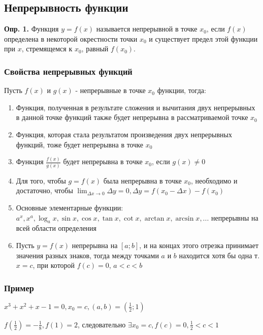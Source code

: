 \documentclass{article}
\begin{document}
\subsection{Непрерывность функции}

\textbf{Опр. 1.} Функция $y = f(x)$ называется непрерывной в точке $x_0$, если $f(x)$ определена в некоторой окрестности точки $x_0$ и существует предел этой функции при $x$, стремящемся к $x_0$, равный $f(x_0)$.

\subsubsection{Свойства непрерывных функций}

Пусть $f(x)$ и $g(x)$ - непрерывные в точке $x_0$ функции, тогда:

\begin{enumerate}
    \item Функция, полученная в результате сложения и вычитания двух непрерывных в данной точке функций также будет непрерывна в рассматриваемой точке $x_0$
    \item Функция, которая стала результатом произведения двух непрерывных функций, тоже будет непрерывна в точке $x_0$
    \item Функция $\frac{f(x)}{g(x)}$ будет непрерывна в точке $x_0$, если $g(x) \ne 0$
    \item Для того, чтобы $g = f(x)$ была непрерывна в точке $x_0$, необходимо и достаточно, чтобы $\lim_{\Delta x \to 0} \Delta y = 0, \Delta y = f(x_0 - \Delta x) - f(x_0)$
    \item Основные элементарные функции: $a^x, x^a, \log_{a} x, \sin x, \cos x, \tan x, \cot x, \arctan x, \arcsin x, ...$ непрерывны на всей области определения
    \item Пусть $y=f(x)$ непрерывна на $[a; b]$, и на концах этого отрезка принимает значения разных знаков, тогда между точками $a$ и $b$ находится хотя бы одна т. $x = c$, при которой $f(c) = 0$, $a < c < b$
\end{enumerate}

\subsubsection{Пример}

$x^3 + x^2 + x - 1 = 0, x_0 = c, (a, b) = (\frac{1}{2}; 1)$

$f(\frac{1}{2}) = -\frac{1}{8}, f(1) = 2$, следовательно $\exists x_0 = c, f(c) = 0, \frac{1}{2} < c < 1$
\end{document}
